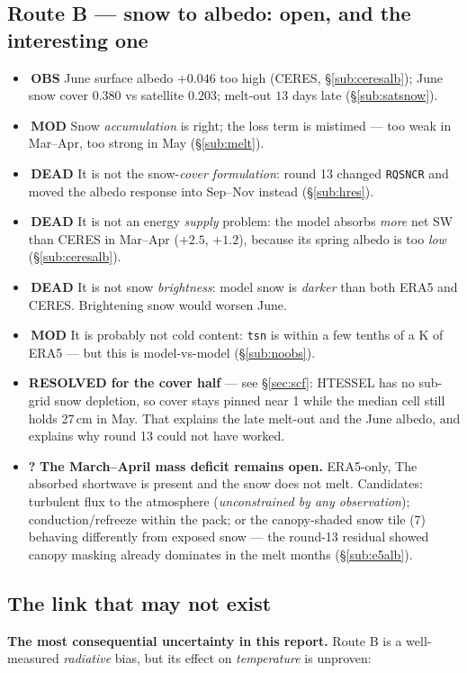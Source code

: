 \documentclass[10pt]{article}
\begin{document}
\subsection{Route B --- snow to albedo: open, and the interesting one}\label{sub:routeb}
\begin{itemize}\itemsep2pt
\item {}\,\textbf{OBS} June surface albedo $+0.046$ too high (CERES,
  \S\ref{sub:ceresalb}); June snow cover $0.380$ vs satellite $0.203$; melt-out $13$
  days late (\S\ref{sub:satsnow}).
\item {}\,\textbf{MOD} Snow \emph{accumulation} is right; the loss term is
  mistimed --- too weak in Mar--Apr, too strong in May (\S\ref{sub:melt}).
\item {}\,\textbf{DEAD} It is not the snow-\emph{cover formulation}: round 13
  changed \texttt{RQSNCR} and moved the albedo response into Sep--Nov instead
  (\S\ref{sub:hres}).
\item {}\,\textbf{DEAD} It is not an energy \emph{supply} problem: the model
  absorbs \emph{more} net SW than CERES in Mar--Apr ($+2.5$, $+1.2$), because its spring
  albedo is too \emph{low} (\S\ref{sub:ceresalb}).
\item {}\,\textbf{DEAD} It is not snow \emph{brightness}: model snow is
  \emph{darker} than both ERA5 and CERES. Brightening snow would worsen June.
\item {}\,\textbf{MOD} It is probably not cold content: \texttt{tsn} is within a
  few tenths of a K of ERA5 --- but this is model-vs-model (\S\ref{sub:noobs}).
\item \textbf{ RESOLVED for the cover half} --- see \S\ref{sec:scf}: HTESSEL
  has no sub-grid snow depletion, so cover stays pinned near 1 while the median cell
  still holds 27\,cm in May. That explains the late melt-out and the June albedo, and
  explains why round 13 could not have worked.
\item \textbf{?} \textbf{The March--April mass deficit remains open.} ERA5-only, The absorbed shortwave is present and the snow does not melt. Candidates:
  turbulent flux to the atmosphere (\emph{unconstrained by any observation});
  conduction/refreeze within the pack; or the canopy-shaded snow tile (7) behaving
  differently from exposed snow --- the round-13 residual showed canopy masking already
  dominates in the melt months (\S\ref{sub:e5alb}).
\end{itemize}

\subsection{The link that may not exist}\label{sub:weaklink}
\textbf{The most consequential uncertainty in this report.} Route B is a well-measured
\emph{radiative} bias, but its effect on \emph{temperature} is unproven:
\end{document}
